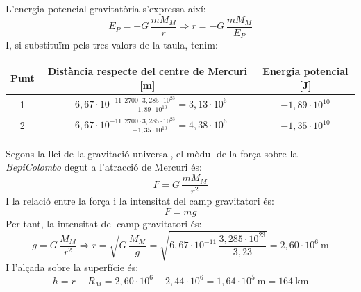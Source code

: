 \begin{solapartat}
 L'energia potencial gravitatòria s'expressa així:
\[ E_P = -G\,\frac{mM_M}{r} \Rightarrow r = -G\,\frac{mM_M}{E_P} \]
I, si substituïm pels tres valors de la taula, tenim:

\begin{center}
\begin{tabular}{|c|c|c|}
\hline
Punt & Distància respecte del centre de Mercuri [m] & Energia potencial [J] \\
\hline
\rule{0pt}{4.5ex}1 & $\displaystyle -6,67\cdot 10^{-11}\,\frac{2700\cdot 3,285\cdot 10^{23}}{-1,89\cdot 10^{10}} = 3,13\cdot 10^{6}$ & $-1,89\cdot 10^{10}$ \\[3ex]
\hline
\rule{0pt}{4.5ex}2 & $\displaystyle -6,67\cdot 10^{-11}\,\frac{2700\cdot 3,285\cdot 10^{23}}{-1,35\cdot 10^{10}} = 4,38\cdot 10^{6}$ & $-1,35\cdot 10^{10}$ \\[3ex]
\hline
\end{tabular}
\end{center}

 Segons la llei de la gravitació universal, el mòdul de la força sobre la \textit{BepiColombo} degut a l'atracció de Mercuri és:
\[ F = G\,\frac{mM_M}{r^2} \]
I la relació entre la força i la intensitat del camp gravitatori és:
\[ F = mg \]
Per tant, la intensitat del camp gravitatori és:
\[ g = G\,\frac{M_M}{r^2} \Rightarrow r = \sqrt{G\,\frac{M_M}{g}} = \sqrt{6,67\cdot 10^{-11}\,\frac{3,285\cdot 10^{23}}{3,23}} = 2,60\cdot 10^{6}\ \mathrm{m} \]
 I l'alçada sobre la superfície és:
\[ h = r - R_M = 2,60\cdot 10^{6} - 2,44\cdot 10^{6} = 1,64\cdot 10^{5}\ \mathrm{m} = 164\ \mathrm{km} \]
\end{solapartat}

